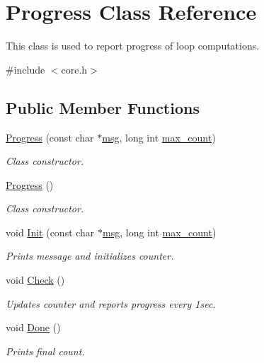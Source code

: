 \hypertarget{classProgress}{
\section{Progress Class Reference}
\label{classProgress}
}


This class is used to report progress of loop computations.  




{\ttfamily \#include $<$core.h$>$}

\subsection*{Public Member Functions}
\begin{DoxyCompactItemize}
\item 
\hyperlink{classProgress_afc6164b4ac61db61319559b1b8cc99f2}{Progress} (const char $\ast$\hyperlink{classProgress_a7eeeaec06e0ab3c1fc871ccb225ede3d}{msg}, long int \hyperlink{classProgress_a9cfb7b6b93778e9c617c38ab26d3d0a0}{max\_\-count})
\begin{DoxyCompactList}\small\item\em Class constructor. \end{DoxyCompactList}\item 
\hypertarget{classProgress_a01d83f02dc49939dd5d14057932a8a8d}{
\hyperlink{classProgress_a01d83f02dc49939dd5d14057932a8a8d}{Progress} ()}
\label{classProgress_a01d83f02dc49939dd5d14057932a8a8d}

\begin{DoxyCompactList}\small\item\em Class constructor. \end{DoxyCompactList}\item 
void \hyperlink{classProgress_a3400f3a809c40b45b63c5196e701db8a}{Init} (const char $\ast$\hyperlink{classProgress_a7eeeaec06e0ab3c1fc871ccb225ede3d}{msg}, long int \hyperlink{classProgress_a9cfb7b6b93778e9c617c38ab26d3d0a0}{max\_\-count})
\begin{DoxyCompactList}\small\item\em Prints message and initializes counter. \end{DoxyCompactList}\item 
void \hyperlink{classProgress_a58375cdfa5fc9e27d3db6c216c6c2248}{Check} ()
\begin{DoxyCompactList}\small\item\em Updates counter and reports progress every 1sec. \end{DoxyCompactList}\item 
void \hyperlink{classProgress_acabb2c4a989f7583dab1c75eb173ebf7}{Done} ()
\begin{DoxyCompactList}\small\item\em Prints final count. \end{DoxyCompactList}\end{DoxyCompactItemize}
